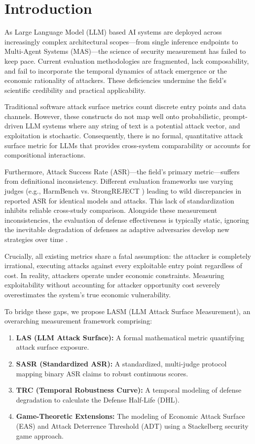 \section{Introduction}
\label{sec:introduction}

As Large Language Model (LLM) based AI systems are deployed across increasingly complex architectural scopes---from single inference endpoints to Multi-Agent Systems (MAS)---the science of security measurement has failed to keep pace. Current evaluation methodologies are fragmented, lack composability, and fail to incorporate the temporal dynamics of attack emergence or the economic rationality of attackers. These deficiencies undermine the field's scientific credibility and practical applicability.

Traditional software attack surface metrics \cite{manadhata2011attack} count discrete entry points and data channels. However, these constructs do not map well onto probabilistic, prompt-driven LLM systems where any string of text is a potential attack vector, and exploitation is stochastic. Consequently, there is no formal, quantitative attack surface metric for LLMs that provides cross-system comparability or accounts for compositional interactions.

Furthermore, Attack Success Rate (ASR)---the field's primary metric---suffers from definitional inconsistency. Different evaluation frameworks use varying judges (e.g., HarmBench vs. StrongREJECT \cite{souly2024strongreject}) leading to wild discrepancies in reported ASR for identical models and attacks. This lack of standardization inhibits reliable cross-study comparison. Alongside these measurement inconsistencies, the evaluation of defense effectiveness is typically static, ignoring the inevitable degradation of defenses as adaptive adversaries develop new strategies over time \cite{nasr2025attacker}.

Crucially, all existing metrics share a fatal assumption: the attacker is completely irrational, executing attacks against every exploitable entry point regardless of cost. In reality, attackers operate under economic constraints. Measuring exploitability without accounting for attacker opportunity cost severely overestimates the system's true economic vulnerability.

To bridge these gaps, we propose LASM (LLM Attack Surface Measurement), an overarching measurement framework comprising:
\begin{enumerate}
    \item \textbf{LAS (LLM Attack Surface):} A formal mathematical metric quantifying attack surface exposure.
    \item \textbf{SASR (Standardized ASR):} A standardized, multi-judge protocol mapping binary ASR claims to robust continuous scores.
    \item \textbf{TRC (Temporal Robustness Curve):} A temporal modeling of defense degradation to calculate the Defense Half-Life (DHL).
    \item \textbf{Game-Theoretic Extensions:} The modeling of Economic Attack Surface (EAS) and Attack Deterrence Threshold (ADT) using a Stackelberg security game approach.
\end{enumerate}

